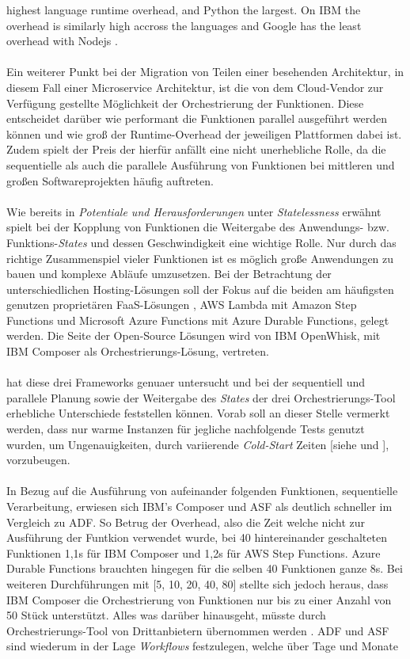 \documentclass[11pt]{article}
\begin{document}
highest language runtime overhead, and Python the largest. On IBM the overhead is similarly high accross the languages and Google has the least overhead with Nodejs \cite{pawlik2019performance}.\\\\ 

Ein weiterer Punkt bei der Migration von Teilen einer besehenden Architektur, in diesem Fall einer Microservice Architektur, ist die von dem Cloud-Vendor zur Verfügung gestellte Möglichkeit der Orchestrierung der Funktionen. Diese entscheidet darüber wie performant die Funktionen parallel ausgeführt werden können und wie groß der Runtime-Overhead der jeweiligen Plattformen dabei ist. Zudem spielt der Preis der hierfür anfällt eine nicht unerhebliche Rolle, da die sequentielle als auch die parallele Ausführung von Funktionen bei mittleren und großen Softwareprojekten häufig auftreten.\\\\ Wie bereits in \textit{Potentiale und Herausforderungen} unter \textit{Statelessness} erwähnt spielt bei der Kopplung von Funktionen die Weitergabe des Anwendungs- bzw. Funktions-\textit{States} und dessen Geschwindigkeit eine wichtige Rolle. Nur durch das richtige Zusammenspiel vieler Funktionen ist es möglich große Anwendungen zu bauen und komplexe Abläufe umzusetzen. Bei der Betrachtung der unterschiedlichen Hosting-Lösungen soll der Fokus auf die beiden am häufigsten genutzen proprietären FaaS-Lösungen \cite{leitner2019mixed}, AWS Lambda mit Amazon Step Functions und Microsoft Azure Functions mit Azure Durable Functions, gelegt werden. Die Seite der Open-Source Lösungen wird von IBM OpenWhisk, mit IBM Composer als Orchestrierungs-Lösung, vertreten.\\\\ \cite{lopez2018comparison} hat diese drei Frameworks genuaer untersucht und bei der sequentiell und parallele Planung sowie der Weitergabe des \textit{States} der drei Orchestrierungs-Tool erhebliche Unterschiede feststellen können. Vorab soll an dieser Stelle vermerkt werden, dass nur \glqq warme\grqq{} Instanzen für jegliche nachfolgende Tests genutzt wurden, um Ungenauigkeiten, durch variierende \textit{Cold-Start} Zeiten [siehe \cite{manner2018cold} und \cite{jackson2018investigation}], vorzubeugen.\\\\ In Bezug auf die Ausführung von aufeinander folgenden Funktionen, sequentielle Verarbeitung, erwiesen sich IBM's Composer und ASF als deutlich schneller im Vergleich zu ADF. So Betrug der Overhead, also die Zeit welche nicht zur Ausführung der Funtkion verwendet wurde, bei 40 hintereinander geschalteten Funktionen 1,1s für IBM Composer und 1,2s für AWS Step Functions. Azure Durable Functions brauchten hingegen für die selben 40 Funktionen ganze 8s. Bei weiteren Durchführungen mit [5, 10, 20, 40, 80] stellte sich jedoch heraus, dass IBM Composer die Orchestrierung von Funktionen nur bis zu einer Anzahl von 50 Stück unterstützt. Alles was darüber hinausgeht, müsste durch Orchestrierungs-Tool von Drittanbietern übernommen werden \cite{lopez2018comparison}. ADF und ASF sind wiederum in der Lage \textit{Workflows} festzulegen, welche über Tage und Monate 
\end{document}
